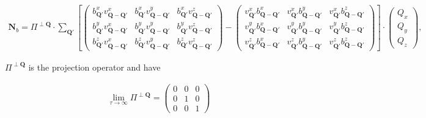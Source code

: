 \documentclass[a4paper,11pt]{article}
\begin{document}
\begin{eqnarray}
\mathbf{N}_b  = \Pi^{\perp\mathbf{Q}}\cdot\sum_{\mathbf{Q}'}
\left[
\left(\begin{array}{ccc}
b_{\mathbf{Q}'}^xv_{\mathbf{Q}-\mathbf{Q}'}^x & b_{\mathbf{Q}'}^xv_{\mathbf{Q}-\mathbf{Q}'}^y & b_{\mathbf{Q}'}^xv_{\mathbf{Q}-\mathbf{Q}'}^z \\
b_{\mathbf{Q}'}^yv_{\mathbf{Q}-\mathbf{Q}'}^x & b_{\mathbf{Q}'}^yv_{\mathbf{Q}-\mathbf{Q}'}^y & b_{\mathbf{Q}'}^yv_{\mathbf{Q}-\mathbf{Q}'}^z \\
b_{\mathbf{Q}'}^zv_{\mathbf{Q}-\mathbf{Q}'}^x & b_{\mathbf{Q}'}^zv_{\mathbf{Q}-\mathbf{Q}'}^y & b_{\mathbf{Q}'}^zv_{\mathbf{Q}-\mathbf{Q}'}^z
\end{array} \right)
-
\left(\begin{array}{ccc}
v_{\mathbf{Q}'}^xb_{\mathbf{Q}-\mathbf{Q}'}^x & v_{\mathbf{Q}'}^xb_{\mathbf{Q}-\mathbf{Q}'}^y & v_{\mathbf{Q}'}^xb_{\mathbf{Q}-\mathbf{Q}'}^z \\
v_{\mathbf{Q}'}^yb_{\mathbf{Q}-\mathbf{Q}'}^x & v_{\mathbf{Q}'}^yb_{\mathbf{Q}-\mathbf{Q}'}^y & v_{\mathbf{Q}'}^yb_{\mathbf{Q}-\mathbf{Q}'}^z \\
v_{\mathbf{Q}'}^zb_{\mathbf{Q}-\mathbf{Q}'}^x & v_{\mathbf{Q}'}^zb_{\mathbf{Q}-\mathbf{Q}'}^y & v_{\mathbf{Q}'}^zb_{\mathbf{Q}-\mathbf{Q}'}^z
\end{array} \right)
\right]
\cdot
\left(\begin{array}{c}
Q_x \\
Q_y \\
Q_z
\end{array} \right),
\end{eqnarray}


$\Pi^{\perp\mathbf{Q}}$ is the projection operator and have

\begin{eqnarray}
\lim\limits_{\tau \rightarrow \infty}{ \Pi^{\perp\mathbf{Q}} } = \left(\begin{array}{ccc}
 0 & 0 & 0 \\
 0 & 1 & 0 \\
 0 & 0 & 1 
\end{array} \right)
\end{eqnarray}
\end{document}
